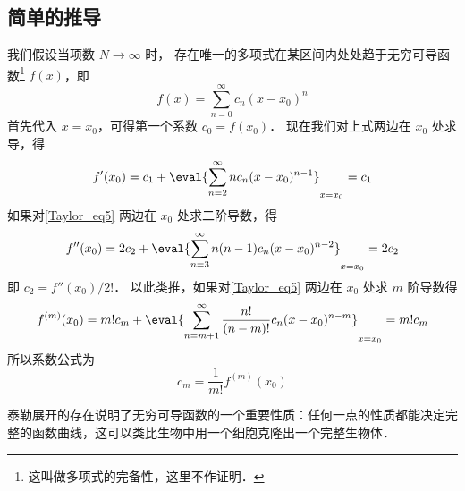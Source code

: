 \subsection{简单的推导}
我们假设当项数 $N \to \infty$ 时， 存在唯一的多项式在某区间内处处趋于无穷可导函数\footnote{这叫做多项式的完备性，这里不作证明．} $f(x)$，即
\begin{equation}\label{Taylor_eq5}
f(x) = \sum_{n = 0}^\infty  c_n (x - x_0)^n
\end{equation}
首先代入 $x = x_0$，可得第一个系数 $c_0 = f(x_0)$． 现在我们对上式两边在 $x_0$ 处求导，得
\begin{equation}
f'(x_0) = c_1 + \eval{ \sum_{n = 2}^\infty n c_n (x - x_0)^{n - 1} }_{x = x_0}  = c_1
\end{equation}
如果对\autoref{Taylor_eq5} 两边在 $x_0$ 处求二阶导数，得
\begin{equation}
f''(x_0) = 2 c_2 + \eval{ \sum_{n = 3}^\infty  n(n - 1) c_n (x - x_0)^{n - 2} }_{x = x_0}  = 2 c_2
\end{equation}
即 $c_2 = f''(x_0)/2!$．  以此类推，如果对\autoref{Taylor_eq5} 两边在 $x_0$ 处求 $m$ 阶导数得
\begin{equation}
f^{(m)}(x_0) = m! c_m + \eval{ \sum_{n = m + 1}^\infty  \frac{n!}{(n - m)!} c_n (x - x_0)^{n - m} }_{x = x_0}  = m! c_m
\end{equation}
所以系数公式为
\begin{equation}
{c_m} = \frac{1}{m!} f^{(m)}(x_0)
\end{equation}

泰勒展开的存在说明了无穷可导函数的一个重要性质：任何一点的性质都能决定完整的函数曲线，这可以类比生物中用一个细胞克隆出一个完整生物体．

